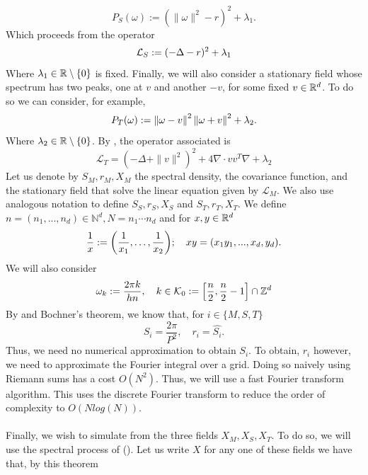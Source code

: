 \documentclass[
    a4paper,
    DIV=14,
    abstract=true,
    numbers=noenddot
]{scrartcl}
\begin{document}
\begin{equation*}
	P_S(\omega):=(\|\omega\|^2-r)^2+\lambda_1.
\end{equation*}
Which proceeds from the operator
\begin{equation}
	\mathcal{L}_S:=(-\Delta-r)^2+\lambda_1
\end{equation}
Where $\lambda_1\in\mathbb{R}\setminus\{0\}$ is fixed. Finally, we will also consider a stationary field whose spectrum has two peaks, one  at $v$ and another $-v$,  for some fixed $v\in\mathbb{R}^d$. To do so we can consider, for example,
\begin{equation*}
	P_T(\omega):=\left\lVert \omega-v \right\rVert^2\left\lVert \omega+v \right\rVert^2+\lambda_2.
\end{equation*}
Where $\lambda_2\in\mathbb{R}\setminus\{0\}$.
By , the operator associated is
\begin{equation}\label{two peaks}
	\mathcal{L}_T=(-\Delta+\|v\|^2)^2+4\nabla\cdot vv^T\nabla+\lambda_2
\end{equation}
Let us denote by $S_M,r_M,X_M$ the spectral density, the covariance function, and the stationary field that solve the linear equation given by $\mathcal{L}_M$. We also use analogous notation to define $S_S,r_S,X_S$ and $S_T,r_T,X_T$. We define $n=(n_1,...,n_d)\in\mathbb{N}^d, N=n_1\cdots n_d$ and for $x,y\in\mathbb{R}^d$
\begin{equation*}
	\frac{1}{x}:=\qty(\frac{1}{x_1},\ldots,\frac{1}{x_2});\quad xy=(x_1y_1,...,x_d,y_d).
\end{equation*}
We will also consider
\begin{equation}\label{omk}
	\omega_k:=\frac{2\pi k}{hn},\quad k\in \mathcal{K}_0:=\qty[\frac{n}{2},\frac{n}{2}-1]\cap \mathbb{Z}^d
\end{equation}
By  and Bochner's theorem, we know that, for $i\in \{M,S,T\}$
\begin{equation*}
	S_i=\frac{2\pi}{P^2},\quad r_i=\hat{S_i}.
\end{equation*}
Thus, we need no numerical approximation to obtain $S_i$. To obtain, $r_i$ however, we need to approximate the Fourier integral over a grid. Doing so naively using Riemann sums has a cost $O(N^2)$. Thus, we will use a fast Fourier transform algorithm. This uses the discrete Fourier transform to reduce the order of complexity to $O(Nlog(N))$.\\
\\
Finally, we wish to simulate from the three fields $X_M,X_S,X_T$. To do so, we will use the spectral process of  (). Let us write $X$ for any one of these fields we have that, by this theorem
\end{document}
